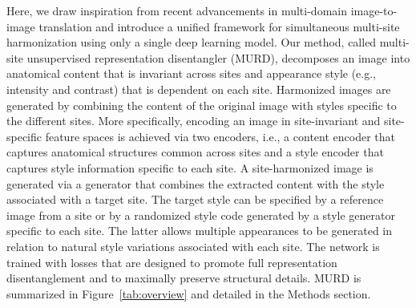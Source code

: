 \documentclass{nature}
\begin{document}
Here, we draw inspiration from recent advancements in multi-domain image-to-image trans\-lation\cite{Anoosheh2018ComboGAN,Choi2018StarGAN,Choi2020StarGANv2} and introduce a unified  framework for simultaneous multi-site harmonization using only a single deep learning model. Our method, called multi-site unsupervised representation disentangler (MURD), decomposes an image into  anatomical content that is invariant across sites and appearance style (e.g., intensity and contrast) that is dependent on each site. Harmonized images are generated by combining the content of the original image with styles specific to the different sites.
More specifically, encoding an image in site-invariant and site-specific feature spaces is achieved via two encoders, i.e., a content encoder that captures anatomical structures common across sites and a style encoder that captures style information specific to each site.
%
A site-harmonized image is generated via a generator that combines the extracted content with the style associated with a target site. 
The target style can be specified by a reference image from a site or by a randomized style code generated by a style generator specific to each site. The latter allows multiple appearances to be generated in relation to natural style variations associated with each site.
The network is trained with losses that are designed to promote full representation disentanglement and to maximally preserve structural details. MURD is summarized in Figure~\ref{tab:overview} and detailed in the Methods section.
\end{document}

